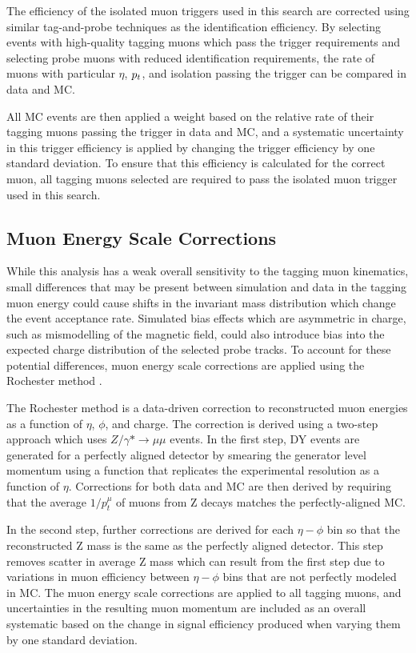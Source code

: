 The efficiency of the isolated muon triggers used in this search are corrected using similar tag-and-probe techniques as the identification efficiency. 
By selecting events with high-quality tagging muons which pass the trigger requirements and selecting probe muons with reduced identification requirements, the rate of muons with particular $\eta$, $p_t$, and isolation passing the trigger can be compared in data and MC.

All MC events are then applied a weight based on the relative rate of their tagging muons passing the trigger in data and MC, and a systematic uncertainty in this trigger efficiency is applied by changing the trigger efficiency by one standard deviation.
To ensure that this efficiency is calculated for the correct muon, all tagging muons selected are required to pass the isolated muon trigger used in this search.

\subsection{Muon Energy Scale Corrections}
While this analysis has a weak overall sensitivity to the tagging muon kinematics, small differences that may be present between simulation and data in the tagging muon energy could cause shifts in the invariant mass distribution which change the event acceptance rate.
Simulated bias effects which are asymmetric in charge, such as mismodelling of the magnetic field, could also introduce bias into the expected charge distribution of the selected probe tracks.
To account for these potential differences, muon energy scale corrections are applied using the Rochester method \cite{rochester_corr}.

The Rochester method is a data-driven correction to reconstructed muon energies as a function of $\eta$, $\phi$, and charge.
The correction is derived using a two-step approach which uses $Z/\gamma* \rightarrow \mu\mu$ events.
In the first step, DY events are generated for a perfectly aligned detector by smearing the generator level momentum using a function that replicates the experimental resolution as a function of $\eta$. 
Corrections for both data and MC are then derived by requiring that the average $1/p_t^\mu$ of muons from Z decays matches the perfectly-aligned MC.

In the second step, further corrections are derived for each $\eta-\phi$ bin so that the reconstructed Z mass is the same as the perfectly aligned detector. 
This step removes scatter in average Z mass which can result from the first step due to variations in muon efficiency between $\eta-\phi$ bins that are not perfectly modeled in MC. 
The muon energy scale corrections are applied to all tagging muons, and uncertainties in the resulting muon momentum are included as an overall systematic based on the change in signal efficiency produced when varying them by one standard deviation.

